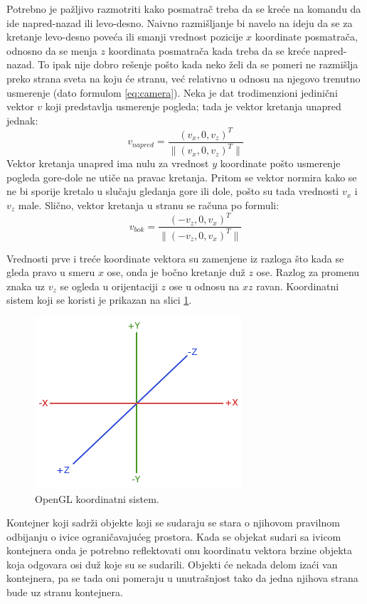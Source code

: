 \documentclass[12pt,oneside]{memoir}
\begin{document}
Potrebno je pažljivo razmotriti kako posmatrač treba da se kreće na komandu da ide napred-nazad ili levo-desno.
Naivno razmišljanje bi navelo na ideju da se za kretanje levo-desno poveća ili smanji vrednost pozicije $x$ koordinate posmatrača,
odnosno da se menja $z$ koordinata posmatrača kada treba da se kreće napred-nazad.
To ipak nije dobro rešenje pošto kada neko želi da se pomeri ne razmišlja preko strana sveta na koju će stranu, 
već relativno u odnosu na njegovo trenutno usmerenje (dato formulom \ref{eq:camera}).
Neka je dat trodimenzioni jedinični vektor $v$ koji predstavlja usmerenje pogleda; tada je vektor 
kretanja unapred jednak: 
$$ v_{napred} = \frac{(v_x, 0, v_z)^T}{\|(v_x, 0, v_z)^T\|} $$
Vektor kretanja unapred ima nulu za vrednost $y$ koordinate pošto usmerenje pogleda gore-dole ne utiče na pravac kretanja.
Pritom se vektor normira kako se ne bi sporije kretalo u slučaju gledanja gore ili dole, 
pošto su tada vrednosti $v_x$ i $v_z$ male.
Slično, vektor kretanja u stranu se računa po formuli:
$$ v_{bok} = \frac{(-v_z, 0, v_x)^T}{\|(-v_z, 0, v_x)^T\|} $$

Vrednosti prve i treće koordinate vektora su zamenjene iz razloga što kada se gleda pravo u smeru $x$ ose, 
onda je bočno kretanje duž $z$ ose. Razlog za promenu znaka uz $v_z$ se ogleda u orijentaciji $z$ ose u odnosu na $xz$ ravan.
Koordinatni sistem koji se koristi je prikazan na slici \ref{fig:coord}.

\begin{figure}[h!]
	\centerfloat
	\includegraphics[scale=1]{coord.png}
	\caption{OpenGL koordinatni sistem.}
	\label{fig:coord}
\end{figure}

Kontejner koji sadrži objekte koji se sudaraju se stara o njihovom pravilnom odbijanju o ivice ograničavajućeg prostora.
Kada se objekat sudari sa ivicom kontejnera onda je potrebno reflektovati onu koordinatu vektora
brzine objekta koja odgovara osi duž koje su se sudarili.
Objekti će nekada delom izaći van kontejnera, pa se tada oni pomeraju u unutrašnjost tako da jedna njihova strana bude uz stranu kontejnera.
\end{document}
